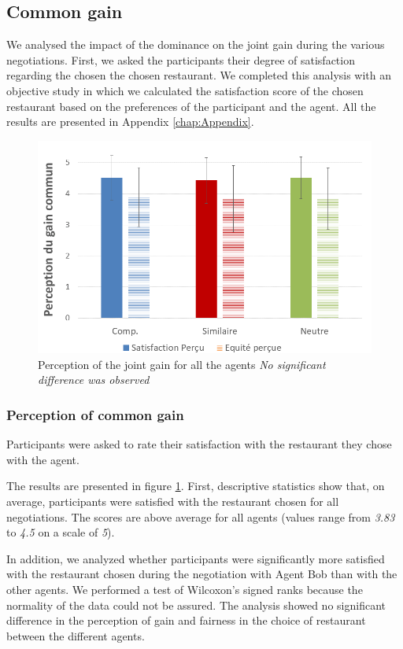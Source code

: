 \documentclass[10pt, a4paper]{article} %
\begin{document}
	\subsection{Common gain}
		We analysed the impact of the dominance on the joint gain during the various negotiations. First, we asked the participants their degree of satisfaction regarding the chosen the chosen restaurant. We completed this analysis with an objective study in which we calculated the satisfaction score of the chosen restaurant based on the preferences of the participant and the agent. All the results are presented in Appendix \ref{chap:Appendix}.
		
			\begin{figure}[h]
			
			\centering
			\includegraphics[width= 0.65 \linewidth,clip=false]{figs/percpGain.PNG}
			\caption{Perception of the joint gain for all the agents \textit{No significant difference was observed}}
			\label{fig:gainCom}
		\end{figure}
	
	\subsubsection{Perception of common gain}
	Participants were asked to rate their satisfaction with the restaurant they chose with the agent.
	
	The results are presented in figure \ref{fig:gainCom}. First, descriptive statistics show that, on average, participants were satisfied with the restaurant chosen for all negotiations. The scores are above average for all agents (values range from \emph{3.83} to \emph{4.5} on a scale of \emph{5}). 
	
	In addition, we analyzed whether participants were significantly more satisfied with the restaurant chosen during the negotiation with Agent Bob than with the other agents. We performed a test of Wilcoxon's signed ranks because the normality of the data could not be assured. The analysis showed no significant difference in the perception of gain and fairness in the choice of restaurant between the different agents. 
	
\end{document}
